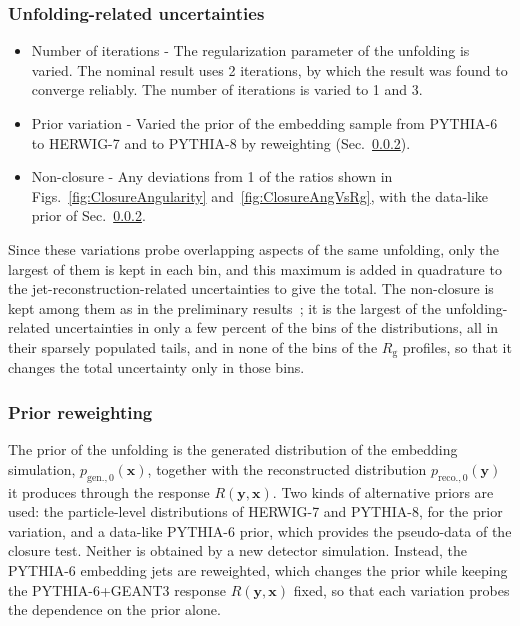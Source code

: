  \subsubsection{Unfolding-related uncertainties}
 \begin{itemize}
 	\item Number of iterations - The regularization parameter of the unfolding is varied. The nominal result uses 2 iterations, by which the result was found to converge reliably. The number of iterations is varied to 1 and 3.
 	\item Prior variation - Varied the prior of the embedding sample from PYTHIA\mbox{-}6 to HERWIG\mbox{-}7 and to PYTHIA\mbox{-}8 by reweighting (Sec.~\ref{sec:priorReweighting}).
 	\item Non-closure - Any deviations from 1 of the ratios shown in Figs.~\ref{fig:ClosureAngularity} and~\ref{fig:ClosureAngVsRg}, with the data-like prior of Sec.~\ref{sec:priorReweighting}.
 \end{itemize}
 Since these variations probe overlapping aspects of the same unfolding, only the largest of them is kept in each bin, and this maximum is added in quadrature to the jet-reconstruction-related uncertainties to give the total.
 The non-closure is kept among them as in the preliminary results~\cite{Pani:HP2026poster}; it is the largest of the unfolding-related uncertainties in only a few percent of the bins of the distributions, all in their sparsely populated tails, and in none of the bins of the \(R_\mathrm{g}\) profiles, so that it changes the total uncertainty only in those bins.

 \subsubsection{Prior reweighting}
 \label{sec:priorReweighting}
 The prior of the unfolding is the generated distribution of the embedding simulation, \(p_{\mathrm{gen.}, 0}(\mathbf{x})\), together with the reconstructed distribution \(p_{\mathrm{reco.}, 0}(\mathbf{y})\) it produces through the response \(R(\mathbf{y}, \mathbf{x})\).
 Two kinds of alternative priors are used: the particle-level distributions of HERWIG\mbox{-}7 and PYTHIA\mbox{-}8, for the prior variation, and a data-like PYTHIA\mbox{-}6 prior, which provides the pseudo-data of the closure test.
 Neither is obtained by a new detector simulation.
 Instead, the PYTHIA\mbox{-}6 embedding jets are reweighted, which changes the prior while keeping the PYTHIA\mbox{-}6+GEANT3 response \(R(\mathbf{y}, \mathbf{x})\) fixed, so that each variation probes the dependence on the prior alone.

